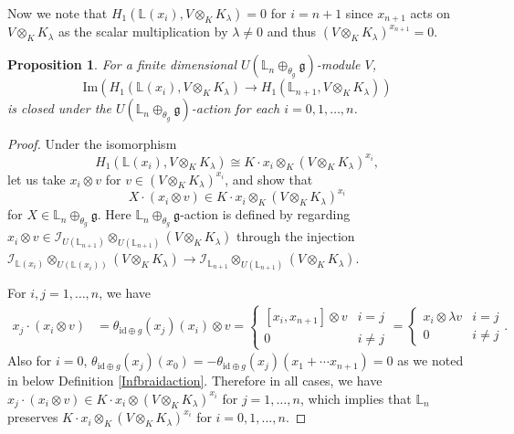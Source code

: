 \documentclass[a4paper,12pt]{article}
\newtheorem{prop}[thm]{Proposition}
\theoremstyle{definition}
\theoremstyle{remark}
\begin{document}
Now we note that $H_1(\mathbb{L}(x_{i}), V\otimes_{K} K_{\lambda})=0$ for $i=n+1$ since $x_{n+1}$ 
acts on $V\otimes_{K} K_{\lambda}$ as the scalar multiplication by $\lambda\neq 0$
and thus $(V\otimes_{K} K_{\lambda})^{x_{n+1}}=0$.
\begin{prop}\label{prop:klsubmodule}
For a finite dimensional $U(\mathbb{L}_{n}\oplus_{\theta_{g}}\mathfrak{g})$-module 
$V$,
\[
	\mathrm{Im}\left(
		H_1(\mathbb{L}(x_{i}), V\otimes_{K} K_{\lambda})\to H_1(\mathbb{L}_{n+1}, V\otimes_{K} K_{\lambda})
	\right)
\] 
is closed under the $U(\mathbb{L}_{n}\oplus_{\theta_{g}}\mathfrak{g})$-action for each $i=0,1,\ldots,n$.
\end{prop}
\begin{proof}
Under the isomorphism
\[
	H_{1}(\mathbb{L}(x_{i}), V\otimes_{K} K_{\lambda})\cong K\cdot x_{i}\otimes_{K} (V\otimes_{K} K_{\lambda})^{x_{i}},
\]
let us take $x_{i}\otimes v$ for $v\in (V\otimes_{K} K_{\lambda})^{x_{i}}$,
and show that
\[
	X\cdot (x_{i}\otimes v)\in K\cdot x_{i}\otimes_{K} (V\otimes_{K} K_{\lambda})^{x_{i}}
\]
for $X\in \mathbb{L}_{n}\oplus_{\theta_{g}}\mathfrak{g}$.
Here $\mathbb{L}_{n}\oplus_{\theta_{g}}\mathfrak{g}$-action 
is defined by regarding  
 $x_{i}\otimes v
\in \mathcal{I}_{U(\mathbb{L}_{n+1})}\otimes_{U(\mathbb{L}_{n+1})}(V\otimes_{K} K_{\lambda})$
through the injection 
$\mathcal{I}_{\mathbb{L}(x_{i})}\otimes_{U(\mathbb{L}(x_{i}))}(V\otimes_{K} K_{\lambda}) \to 
\mathcal{I}_{\mathbb{L}_{n+1}}\otimes_{U(\mathbb{L}_{n+1})}(V\otimes_{K} K_{\lambda})$.


For $i,j=1,\ldots,n$,
we have 
\begin{align*}
x_{j}\cdot (x_{i}\otimes v)&=\theta_{\mathrm{id}\oplus g}(x_{j})(x_{i})\otimes v
=\begin{cases}
[x_{i},x_{n+1}]\otimes v& i= j\\
0& i\neq j
\end{cases}
=\begin{cases}
x_{i}\otimes \lambda v& i=j\\
0& i\neq j
\end{cases}.
\end{align*}
Also for $i=0$, $\theta_{\mathrm{id}\oplus g}(x_{j})(x_{0})
=-\theta_{\mathrm{id}\oplus g}(x_{j})(x_{1}+\cdots x_{n+1})=0$
as we noted in below Definition \ref{Infbraidaction}.
Therefore in all cases, we have 
$x_{j}\cdot (x_{i}\otimes v)\in K\cdot x_{i}\otimes (V\otimes_{K}K_{\lambda})^{x_{i}}$
for $j=1,\ldots,n$, which
implies that 
$\mathbb{L}_{n}$
preserves $K\cdot x_{i}\otimes_{K} (V\otimes_{K}K_{\lambda})^{x_{i}}$ for $i=0,1,\ldots,n$.


\end{proof}
\end{document}

